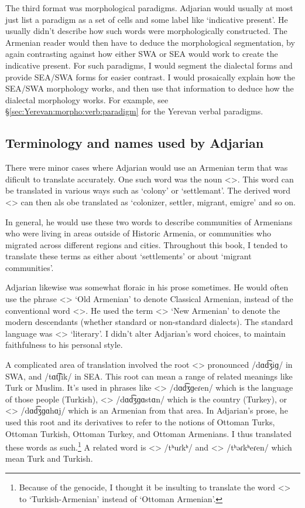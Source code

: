 The third format was morphological paradigms. Adjarian would usually at most just list a paradigm as a set of cells and some label like `indicative present'. He usually didn't describe how such words were morphologically constructed. The Armenian reader would then have to deduce the morphological segmentation, by again contrasting against how either SWA or SEA would work to  create the indicative present. For such paradigms, I would segment the dialectal forms and provide SEA/SWA forms for easier contrast. I would prosaically explain how the SEA/SWA morphology works, and then use that information to deduce how the dialectal morphology works. For example, see \S\ref{sec:Yerevan:morpho:verb:paradigm} for the Yerevan verbal paradigms. 



\subsection{Terminology and names used by Adjarian}\label{sec:HossepIntro:translation:name}

There were minor cases where Adjarian would use an Armenian term that was dificult to translate accurately. One such word was the noun <>. This word can be translated in various ways such as `colony' or `settlemant'. The derived word <> can then als obe translated as `colonizer, settler, migrant, emigre' and so on. 

In general, he would use these two words to describe communities of Armenians who were living in areas outside of Historic Armenia, or communities who migrated across different regions and cities. Throughout this book, I tended to translate these terms as either about `settlements' or about `migrant communities'.

Adjarian likewise was somewhat floraic in his prose sometimes. He would often use the phrase <> `Old Armenian' to denote Classical Armenian, instead of the conventional word <>. He used the term <> `New Armenian' to denote the modern descendants (whether standard or non-standard dialects). The standard language was <> `literary'. I didn't alter Adjarian's word choices, to maintain faithfulness to his personal style. 

A complicated area of translation involved the root <> pronounced /dɑd͡ʒiɡ/ in SWA, and /tɑt͡ʃik/ in SEA. This root can mean a range of related meanings like Turk or Muslim. It's used in phrases like <> /dɑd͡ʒɡeɾen/ which is the language of those people (Turkish), <> /dɑd͡ʒɡɑstɑn/ which is the country (Turkey), or <> /dɑd͡ʒɡɑhɑj/ which is an Armenian from that area. In Adjarian's prose, he used this root and its derivatives to refer to the notions of  Ottoman Turks, Ottoman Turkish, Ottoman Turkey, and Ottoman Armenians. I thus translated these words as such.\footnote{Because of the genocide, I thought it be insulting to translate the word  <> to `Turkish-Armenian' instead of `Ottoman Armenian'. } A related word is <> /tʰuɾkʰ/ and <> /tʰəɾkʰeɾen/ which mean Turk and Turkish. 

